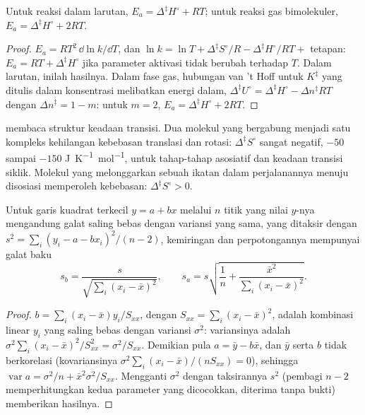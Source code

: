\begin{proposition}\label{prop:b3:rate-theories:ea-dh}
Untuk reaksi dalam larutan, $E_a = \Delta^{\ddagger}H^\circ + RT$; untuk reaksi gas
bimolekuler, $E_a = \Delta^{\ddagger}H^\circ + 2RT$.
\end{proposition}

\begin{proof}
$E_a = RT^2\,\dd\ln k/\dd T$, dan $\ln k = \ln T + \Delta^{\ddagger}S^\circ/R - \Delta^{\ddagger}H^\circ/RT + $ tetapan: $E_a =
RT + \Delta^{\ddagger}H^\circ$ jika parameter aktivasi tidak berubah terhadap $T$. Dalam
larutan, inilah hasilnya. Dalam fase gas, hubungan van 't Hoff untuk
$K^{\ddagger}$ yang ditulis dalam konsentrasi melibatkan energi dalam,
$\Delta^{\ddagger}U^\circ = \Delta^{\ddagger}H^\circ - \Delta n^{\ddagger}RT$
dengan $\Delta n^{\ddagger} = 1 - m$: untuk $m = 2$, $E_a = \Delta^{\ddagger}H^\circ + 2RT$.
\end{proof}

 membaca struktur keadaan transisi. Dua molekul yang bergabung
menjadi satu kompleks kehilangan kebebasan translasi dan rotasi:
$\Delta^{\ddagger}S^\circ$ sangat negatif, $-50$ sampai $-150$ \unit{J.K^{-1}.mol^{-1}}, untuk
tahap-tahap asosiatif dan keadaan transisi siklik. Molekul yang melonggarkan
sebuah ikatan dalam perjalanannya menuju disosiasi memperoleh kebebasan:
$\Delta^{\ddagger}S^\circ > 0$.

\begin{proposition}\label{prop:b3:rate-theories:slope-uncertainty}
Untuk garis kuadrat terkecil $y = a + bx$ melalui $n$ titik yang nilai $y$-nya
mengandung galat saling bebas dengan variansi yang sama, yang ditaksir dengan
$s^2 = \sum_i(y_i - a - bx_i)^2/(n - 2)$, kemiringan dan perpotongannya
mempunyai galat baku
\[
  s_b = \frac{s}{\sqrt{\sum_i(x_i - \bar x)^2}}, \qquad
  s_a = s\sqrt{\frac1n + \frac{\bar x^2}{\sum_i(x_i - \bar x)^2}} .
\]
\end{proposition}

\begin{proof}
$b = \sum_i(x_i - \bar x)y_i/S_{xx}$, dengan $S_{xx} = \sum_i(x_i - \bar x)^2$, adalah
kombinasi linear $y_i$ yang saling bebas dengan variansi $\sigma^2$: variansinya
adalah $\sigma^2\sum_i(x_i - \bar x)^2/S_{xx}^2 = \sigma^2/S_{xx}$. Demikian pula
$a = \bar y - b\bar x$, dan $\bar y$ serta $b$ tidak berkorelasi (kovariansinya
$\sigma^2\sum_i(x_i - \bar x)/(nS_{xx}) = 0$), sehingga
$\operatorname{var}a = \sigma^2/n + \bar x^2\sigma^2/S_{xx}$. Mengganti $\sigma^2$
dengan taksirannya $s^2$ (pembagi $n - 2$ memperhitungkan kedua parameter yang
dicocokkan, diterima tanpa bukti) memberikan hasilnya.
\end{proof}

